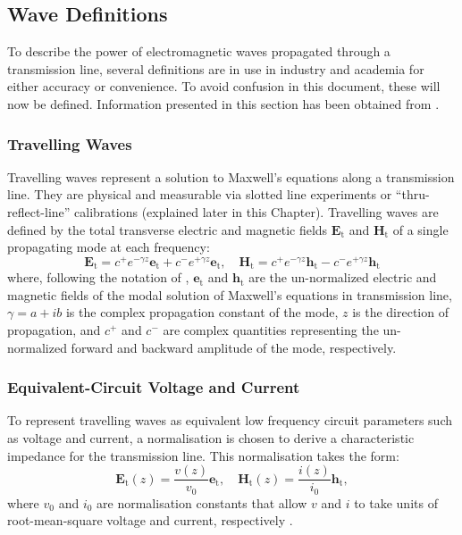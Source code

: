\documentclass[../thesis/thesis.tex]{subfiles}
\begin{document}
\begin{refsection}
\subsection{Wave Definitions}

To describe the power of electromagnetic waves propagated through a transmission line, several definitions are in use in industry and academia for either accuracy or convenience. To avoid confusion in this document, these will now be defined. Information presented in this section has been obtained from \cite{Williams_2013,Marcuvitz_1951,Marks_1992,Kurokawa_1965,Williams_2001}.

\subsubsection{Travelling Waves}

Travelling waves represent a solution to Maxwell's equations along a transmission line. They are physical and measurable via slotted line experiments or ``thru-reflect-line'' calibrations (explained later in this Chapter). Travelling waves are defined by the total transverse electric and magnetic fields $\bm{E}_\textrm{t}$ and $\bm{H}_\textrm{t}$ of a single propagating mode at each frequency:
\begin{equation}
\bm{E}_\textrm{t}=c^+e^{-\gamma z}\bm{e}_\textrm{t}+c^-e^{+\gamma z}\bm{e}_\textrm{t},\quad
\bm{H}_\textrm{t}=c^+e^{-\gamma z}\bm{h}_\textrm{t}-c^-e^{+\gamma z}\bm{h}_\textrm{t}
\end{equation}
where, following the notation of \cite{Williams_2001}, $\bm{e}_\textrm{t}$ and $\bm{h}_\textrm{t}$ are the un-normalized electric and magnetic fields of the modal solution of Maxwell’s equations in transmission line, $\gamma=a+ib$ is the complex propagation constant of the mode, $z$ is the direction of propagation, and $c^+$ and $c^-$ are complex quantities representing the un-normalized forward and backward amplitude of the mode, respectively.

\subsubsection{Equivalent-Circuit Voltage and Current}

To represent travelling waves as equivalent low frequency circuit parameters such as voltage and current, a normalisation is chosen to derive a characteristic impedance for the transmission line. This normalisation takes the form:
\begin{equation}
\bm{E}_\textrm{t}(z)=\dfrac{v(z)}{v_0}\bm{e}_\textrm{t},\quad
\bm{H}_\textrm{t}(z)=\dfrac{i(z)}{i_0}\bm{h}_\textrm{t},
\end{equation}
where $v_0$ and $i_0$ are normalisation constants that allow $v$ and $i$ to take units of root-mean-square voltage and current, respectively \cite{Williams_2001}.


\end{refsection}
\end{document}
